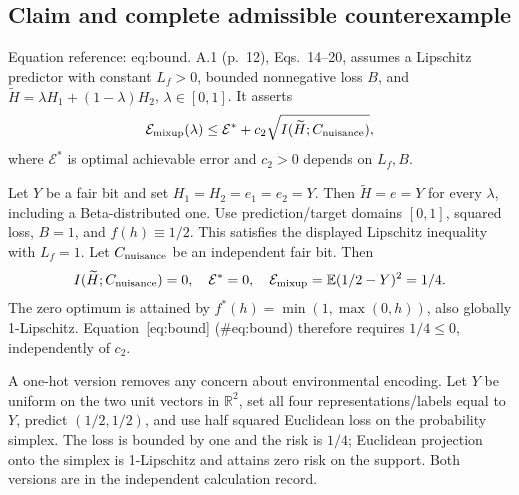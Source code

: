 \documentclass[10pt]{article}
\begin{document}
\subsection*{Claim and complete admissible counterexample}
Equation reference: eq:bound. A.1 (p. 12), Eqs. 14–20, assumes a Lipschitz predictor with constant \(L_f>0\), bounded nonnegative loss \(B\), and \(\widetilde H=\lambda H_1+(1-\lambda)H_2\), \(\lambda\in[0,1]\). It asserts \[
 \mathcal E_{\rm mixup}(\lambda)
 \leq \mathcal E^*+c_2\sqrt{I(\widetilde H;C_{\rm nuisance})},\] where \(\mathcal E^*\) is optimal achievable error and \(c_2>0\) depends on \(L_f,B\).\par
Let \(Y\) be a fair bit and set \(H_1=H_2=e_1=e_2=Y\). Then \(\widetilde H=e=Y\) for every \(\lambda\), including a Beta-distributed one. Use prediction/target domains \([0,1]\), squared loss, \(B=1\), and \(f(h)\equiv1/2\). This satisfies the displayed Lipschitz inequality with \(L_f=1\). Let \(C_{\rm nuisance}\) be an independent fair bit. Then \[I(\widetilde H;C_{\rm nuisance})=0,\quad
 \mathcal E^*=0,\quad
 \mathcal E_{\rm mixup}=\mathbb E(1/2-Y)^2=1/4.\] The zero optimum is attained by \(f^*(h)=\min(1,\max(0,h))\), also globally 1-Lipschitz. Equation [eq:bound] (\#eq:bound) therefore requires \(1/4\leq0\), independently of \(c_2\).\par
A one-hot version removes any concern about environmental encoding. Let \(Y\) be uniform on the two unit vectors in \(\mathbb R^2\), set all four representations/labels equal to \(Y\), predict \((1/2,1/2)\), and use half squared Euclidean loss on the probability simplex. The loss is bounded by one and the risk is \(1/4\); Euclidean projection onto the simplex is 1-Lipschitz and attains zero risk on the support. Both versions are in the independent calculation record.\par
\end{document}
